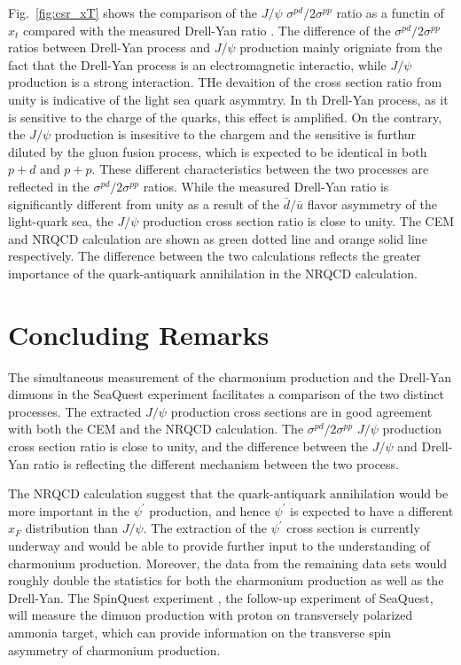 \documentclass[10pt,a4paper,final]{article}
\begin{document}
Fig.~\ref{fig:csr_xT} shows the comparison of the $J/\psi$ $\sigma^{pd}/2\sigma^{pp}$ ratio
as a functin of $x_t$ compared with the measured Drell-Yan ratio \cite{dove2021}.
The difference of the $\sigma^{pd}/2\sigma^{pp}$ ratios between Drell-Yan process and $J/\psi$ 
production mainly origniate from the fact that the Drell-Yan process is an electromagnetic 
interactio, while $J/\psi$ production is a strong interaction. THe devaition of the cross
section ratio from unity is indicative of the light sea quark asymmtry. In th Drell-Yan
process, as it is sensitive to the charge of the quarks, this effect is amplified.
On the contrary, the $J/\psi$ production is insesitive to the chargem and the sensitive is
furthur diluted by the gluon fusion process, which is expected to be identical in both $p+d$ and $p+p$.
These
different characteristics between the two processes are reflected in the
$\sigma^{pd}/2\sigma^{pp}$ ratios. While the measured Drell-Yan ratio
is significantly different from unity as a result of the $\bar{d}/\bar{u}$
flavor asymmetry of the light-quark sea, the $J/\psi$ production cross section ratio
is close to unity.
The CEM and NRQCD calculation are shown as green dotted line and orange solid line
respectively. The difference between the two calculations reflects the greater
importance of the quark-antiquark annihilation in the NRQCD calculation.

\section{Concluding Remarks}
The simultaneous measurement of the charmonium production and the Drell-Yan dimuons
in the SeaQuest experiment facilitates a comparison of the two distinct processes. The
extracted $J/\psi$ production cross sections are in good agreement with both the CEM
and the NRQCD calculation. The $\sigma^{pd}/2\sigma^{pp}$ $J/\psi$ production cross section ratio
is close to unity, and the difference between the $J/\psi$ and Drell-Yan
ratio is reflecting the different mechanism between the two process.

The NRQCD calculation suggest that the quark-antiquark annihilation would
be more important in the $\psi^\prime$ production, and hence $\psi^\prime$ is expected
to have a different $x_F$ distribution than $J/\psi$. The extraction of the $\psi^\prime$
cross section is currently underway and would be able to provide further input to
the understanding of charmonium production. Moreover, the data from the remaining
data sets would roughly double the statistics for both the charmonium production as well as the Drell-Yan.
The SpinQuest experiment \cite{geesaman2014}, the follow-up experiment of SeaQuest, will measure the dimuon
production with proton on transversely polarized ammonia target, which can provide information
on the transverse spin asymmetry of charmonium production.

\printbibliography[heading=bibintoc,title={References}]
\end{document}
